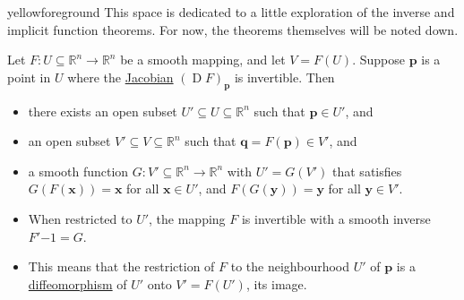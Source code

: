 \documentclass[notoc,notitlepage]{tufte-book}
\DeclareMathOperator{\D}{D}
\begin{document}
\begin{quotebox}{yellow}{foreground}
  This space is dedicated to a little exploration of the inverse and implicit
  function theorems. For now, the theorems themselves will be noted down.
\end{quotebox}

\begin{thm}\label{thm:inverse_function_theorem}
  Let $F : U \subseteq \mathbb{R}^n \to \mathbb{R}^n$ be a smooth mapping, and
  let $V = F(U)$. Suppose $\bm{p}$ is a point in $U$ where the
  \hyperref[defn:differential]{Jacobian} $(\D F)_{\bm{p}}$ is invertible. Then
  \begin{itemize}
    \item there exists an open subset $U' \subseteq U \subseteq \mathbb{R}^n$
      such that $\bm{p} \in U'$, and
    \item an open subset $V' \subseteq V \subseteq \mathbb{R}^n$ such that
      $\bm{q} = F(\bm{p}) \in V'$, and
    \item a smooth function $G : V' \subseteq \mathbb{R}^n \to \mathbb{R}^n$
      with $U' = G(V')$ that satisfies $G(F(\bm{x})) = \bm{x}$ for all $\bm{x}
      \in U'$, and $F(G(\bm{y})) = \bm{y}$ for all $\bm{y} \in V'$.
  \end{itemize}
\end{thm}

\begin{note}
  \begin{itemize}
    \item When restricted to $U'$, the mapping $F$ is invertible with a smooth
      inverse $F'{-1} = G$.
    \item This means that the restriction of $F$ to the neighbourhood $U'$ of
      $\bm{p}$ is a \hyperref[defn:diffeomorphism]{diffeomorphism} of $U'$ onto
      $V' = F(U')$, its image.
  \end{itemize}
\end{note}
\end{document}
